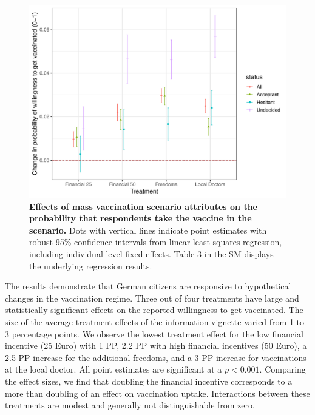 \documentclass[12pt]{article}
\begin{document}
\begin{figure}
 \centering
 \includegraphics[width=1\linewidth]{figures/figure_2.pdf}
  \caption{\textbf{Effects of mass vaccination scenario attributes on the probability that respondents take the vaccine in the scenario.} Dots with vertical lines indicate point estimates with robust 95\% confidence intervals from linear least squares regression, including individual level fixed effects. Table 3 in the SM displays the underlying regression results.}
\end{figure}





The results demonstrate that German citizens are responsive to hypothetical changes in the vaccination regime. Three out of four treatments have large and statistically significant effects on the reported willingness to get vaccinated. The size of the average treatment effects of the information vignette varied from 1 to 3 percentage points. We observe the lowest treatment effect for the low financial incentive (25 Euro) with 1 PP,  2.2 PP with high financial incentives (50 Euro), a 2.5 PP increase for the additional freedoms, and a 3 PP increase for vaccinations at the local doctor. All point estimates are significant at a $p < 0.001$. Comparing the effect sizes, we find that doubling the financial incentive corresponds to a more than doubling of an effect on vaccination uptake. Interactions between these treatments are modest and generally not distinguishable from zero.
\end{document}
